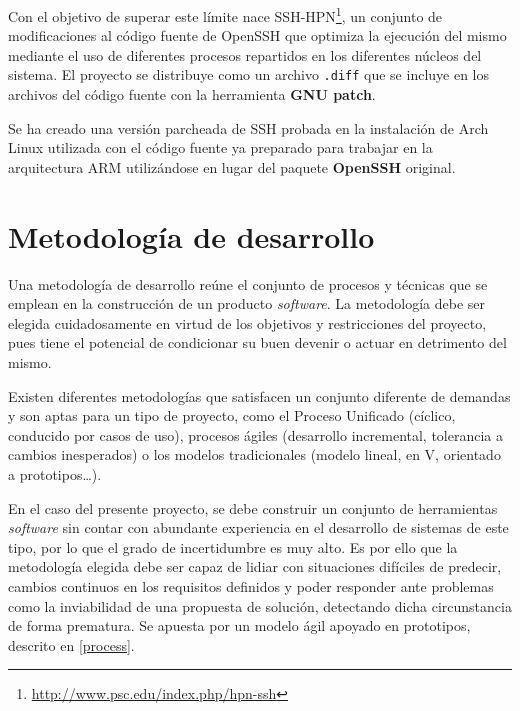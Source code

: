Con el objetivo de superar este límite nace SSH-HPN\footnote{\href{http://www.psc.edu/index.php/hpn-ssh}{http://www.psc.edu/index.php/hpn-ssh}}, un conjunto de modificaciones al código fuente de OpenSSH que optimiza la ejecución del mismo mediante el uso de diferentes procesos repartidos en los diferentes núcleos del sistema. El proyecto se distribuye como un archivo \texttt{.diff} que se incluye en los archivos del código fuente con la herramienta \textbf{GNU patch}.

Se ha creado una versión parcheada de SSH probada en la instalación de Arch Linux utilizada con el código fuente ya preparado para trabajar en la arquitectura ARM utilizándose en lugar del paquete \textbf{OpenSSH} original.



\section{Metodología de desarrollo}

Una metodología de desarrollo reúne el conjunto de procesos y técnicas que se emplean en la construcción de un producto \textit{software}. La metodología debe ser elegida cuidadosamente en virtud de los objetivos y restricciones del proyecto, pues tiene el potencial de condicionar su buen devenir o actuar en detrimento del mismo.

Existen diferentes metodologías que satisfacen un conjunto diferente de demandas y son aptas para un tipo de proyecto, como el Proceso Unificado (cíclico, conducido por casos de uso), procesos ágiles (desarrollo incremental, tolerancia a cambios inesperados) o los modelos tradicionales (modelo lineal, en V, orientado a prototipos\dots).

En el caso del presente proyecto, se debe construir un conjunto de herramientas \textit{software} sin contar con abundante experiencia en el desarrollo de sistemas de este tipo, por lo que el grado de incertidumbre es muy alto. Es por ello que la metodología elegida debe ser capaz de lidiar con situaciones difíciles de predecir, cambios continuos en los requisitos definidos y poder responder ante problemas como la inviabilidad de una propuesta de solución, detectando dicha circunstancia de forma prematura. Se apuesta por un modelo ágil apoyado en prototipos, descrito en \ref{process}.
